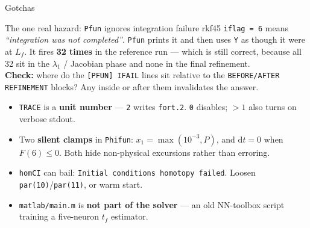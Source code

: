 \documentclass[10pt,aspectratio=169]{beamer}
\newcommand{\code}[1]{\texttt{\small #1}}
\newcommand{\file}[1]{\texttt{\small #1}}
\newcommand{\Lf}{L_f}
\begin{document}
\begin{frame}{Gotchas}

\begin{alertblock}{The one real hazard: \code{Pfun} ignores integration
failure}
rkf45 \code{iflag = 6} means \emph{``integration was not completed''}.
\code{Pfun} prints it and then uses \code{Y} as though it were at $\Lf$.
It fires \textbf{32 times} in the reference run --- which is still correct,
because all 32 sit in the $\lambda_1$ / Jacobian phase and none in the final
refinement.\\[3pt]
\textbf{Check:} where do the \code{[PFUN] IFAIL} lines sit relative to the
\code{BEFORE/AFTER REFINEMENT} blocks? Any inside or after them invalidates
the answer.
\end{alertblock}

\begin{itemize}\small
\item \code{TRACE} is a \textbf{unit number} --- \code{2} writes
      \file{fort.2}. \code{0} disables; $>1$ also turns on verbose stdout.
\item Two \textbf{silent clamps} in \code{Phifun}: $x_1 = \max(10^{-3},P)$,
      and $\mathrm{d}t = 0$ when $F(6)\le 0$. Both hide non-physical
      excursions rather than erroring.
\item \code{homCI} can bail: \code{Initial conditions homotopy failed}.
      Loosen \code{par(10)}/\code{par(11)}, or warm start.
\item \file{matlab/main.m} is \textbf{not part of the solver} --- an old
      NN-toolbox script training a five-neuron $t_f$ estimator.
\end{itemize}
\end{frame}
\end{document}
